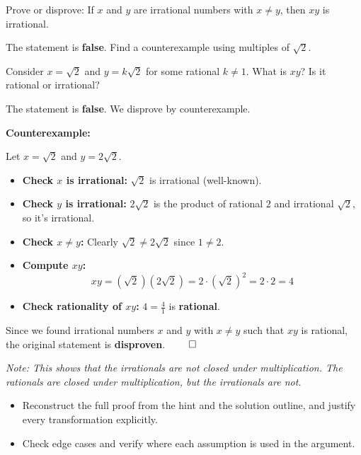 
\begin{problem}
Prove or disprove: If $x$ and $y$ are irrational numbers with $x \neq y$, then $xy$ is irrational.
\end{problem}

\begin{hint}
The statement is \textbf{false}. Find a counterexample using multiples of $\sqrt{2}$.

Consider $x = \sqrt{2}$ and $y = k\sqrt{2}$ for some rational $k \neq 1$. What is $xy$? Is it rational or irrational?
\end{hint}

\begin{solution}
The statement is \textbf{false}. We disprove by counterexample.

\vspace{0.3cm}

\textbf{Counterexample:}

Let $x = \sqrt{2}$ and $y = 2\sqrt{2}$.

\begin{itemize}
\item \textbf{Check $x$ is irrational:} $\sqrt{2}$ is irrational (well-known).
\item \textbf{Check $y$ is irrational:} $2\sqrt{2}$ is the product of rational $2$ and irrational $\sqrt{2}$, so it's irrational.
\item \textbf{Check $x \neq y$:} Clearly $\sqrt{2} \neq 2\sqrt{2}$ since $1 \neq 2$.
\item \textbf{Compute $xy$:}
\[
xy = (\sqrt{2})(2\sqrt{2}) = 2 \cdot (\sqrt{2})^2 = 2 \cdot 2 = 4
\]
\item \textbf{Check rationality of $xy$:} $4 = \frac{4}{1}$ is \textbf{rational}.
\end{itemize}

\vspace{0.3cm}

Since we found irrational numbers $x$ and $y$ with $x \neq y$ such that $xy$ is rational, the original statement is \textbf{disproven}. $\qed$

\vspace{0.3cm}

\textit{Note: This shows that the irrationals are not closed under multiplication. The rationals are closed under multiplication, but the irrationals are not.}
\end{solution}

\begin{takeaways}
\begin{itemize}[leftmargin=*]
\item Reconstruct the full proof from the hint and the solution outline, and justify every transformation explicitly.
\item Check edge cases and verify where each assumption is used in the argument.
\end{itemize}
\end{takeaways}
